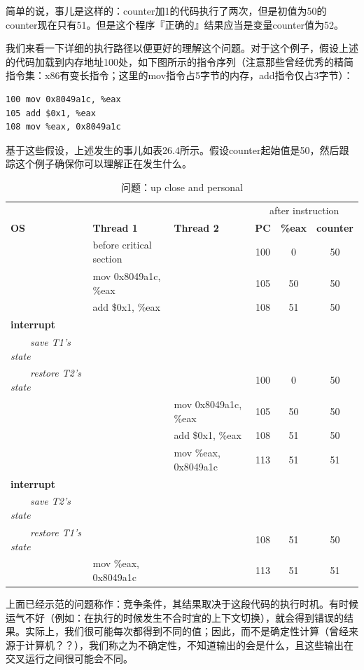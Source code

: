 简单的说，事儿是这样的：counter加1的代码执行了两次，但是初值为50的counter现在只有51。但是这个程序『正确的』结果应当是变量counter值为52。

我们来看一下详细的执行路径以便更好的理解这个问题。对于这个例子，假设上述的代码加载到内存地址100处，如下图所示的指令序列（注意那些曾经优秀的精简指令集：x86有变长指令；这里的mov指令占5字节的内存，add指令仅占3字节）：
\begin{verbatim}
100 mov 0x8049a1c, %eax
105 add $0x1, %eax
108 mov %eax, 0x8049a1c
\end{verbatim}
基于这些假设，上述发生的事儿如表26.4所示。假设counter起始值是50，然后跟踪这个例子确保你可以理解正在发生什么。
\begin{table}[h]
{\footnotesize
\begin{tabular}{p{3cm} p{3cm} p{3cm} c c c}
 & & & \multicolumn{3}{c|}{after instruction} \\
\textbf{OS}&\textbf{Thread 1}&\textbf{Thread 2} & \textbf{PC}  & \textbf{\%eax} & \textbf{counter}\\
\midrule[1.1pt]
 & before critical section &  & 100 & 0 & 50 \\
 & mov 0x8049a1c, \%eax  &  & 105 & 50 & 50\\
 & add \$0x1, \%eax &  & 108 & 51 & 50 \\
 \textbf{interrupt} & & & & & \\
 ~~~~\textsl{save T1's state} & & & & & \\
 ~~~~\textsl{restore T2's state} & & & 100 & 0 & 50 \\
  & & mov 0x8049a1c, \%eax & 105 & 50 & 50 \\
  & & add \$0x1, \%eax & 108 & 51 & 50 \\
  & & mov \%eax, 0x8049a1c & 113 & 51 & 51 \\
\textbf{interrupt} & & & & & \\
 ~~~~\textsl{save T2's state} & & & & & \\
 ~~~~\textsl{restore T1's state} & & & 108 & 51 & 50 \\
  & mov \%eax, 0x8049a1c & & 113 & 51 & 51 \\
\end{tabular}}
\caption{问题：up close and personal}\color{black}\label{tab26-1}
\end{table}

上面已经示范的问题称作：竞争条件，其结果取决于这段代码的执行时机。有时候运气不好（例如：在执行的时候发生不合时宜的上下文切换），就会得到错误的结果。实际上，我们很可能每次都得到不同的值；因此，而不是确定性计算（曾经来源于计算机？？），我们称之为不确定性，不知道输出的会是什么，且这些输出在交叉运行之间很可能会不同。

